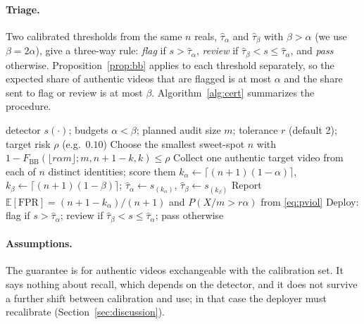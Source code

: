 

\paragraph{Triage.}
Two calibrated thresholds from the same $n$ reals, $\hat\tau_\alpha$ and $\hat\tau_\beta$ with $\beta>\alpha$ (we use $\beta=2\alpha$), give a three-way rule: \emph{flag} if $s>\hat\tau_\alpha$, \emph{review} if $\hat\tau_\beta<s\le\hat\tau_\alpha$, and \emph{pass} otherwise. Proposition~\ref{prop:bb} applies to each threshold separately, so the expected share of authentic videos that are flagged is at most $\alpha$ and the share sent to flag or review is at most $\beta$. Algorithm~\ref{alg:cert} summarizes the procedure.

\begin{algorithm}[t]
\caption{Real-Shot Budget Certificate}
\label{alg:cert}
\begin{algorithmic}[1]
\Require detector $s(\cdot)$; budgets $\alpha<\beta$; planned audit size $m$; tolerance $r$ (default 2); target risk $\rho$ (e.g.\ $0.10$)
\State Choose the smallest sweet-spot $n$ with $1-F_{\mathrm{BB}}(\lfloor r\alpha m\rfloor;m,n+1-k,k)\le\rho$ \Comment{\eqref{eq:pviol}}
\State Collect one authentic target video from each of $n$ distinct identities; score them
\State $k_\alpha\gets\lceil(n+1)(1-\alpha)\rceil$, $k_\beta\gets\lceil(n+1)(1-\beta)\rceil$; $\hat\tau_\alpha\gets s_{(k_\alpha)}$, $\hat\tau_\beta\gets s_{(k_\beta)}$
\State Report $\mathbb{E}[\mathrm{FPR}]=(n+1-k_\alpha)/(n+1)$ and $P(X/m>r\alpha)$ from \eqref{eq:pviol}
\State Deploy: flag if $s>\hat\tau_\alpha$; review if $\hat\tau_\beta<s\le\hat\tau_\alpha$; pass otherwise
\end{algorithmic}
\end{algorithm}

\paragraph{Assumptions.}
The guarantee is for authentic videos exchangeable with the calibration set. It says nothing about recall, which depends on the detector, and it does not survive a further shift between calibration and use; in that case the deployer must recalibrate (Section~\ref{sec:discussion}).
